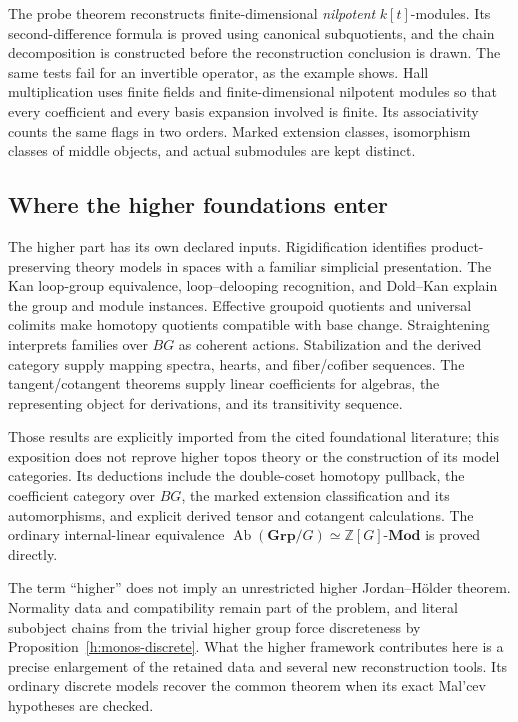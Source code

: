 The probe theorem reconstructs finite-dimensional \emph{nilpotent}
$k[t]$-modules. Its second-difference formula is proved using canonical
subquotients, and the chain decomposition is constructed before the
reconstruction conclusion is drawn. The same tests fail for an invertible
operator, as the example shows. Hall multiplication uses finite fields
and finite-dimensional nilpotent modules so that every coefficient and
every basis expansion involved is finite. Its associativity counts the
same flags in two orders. Marked extension classes, isomorphism classes
of middle objects, and actual submodules are kept distinct.

\subsection{Where the higher foundations enter}

The higher part has its own declared inputs. Rigidification identifies
product-preserving theory models in spaces with a familiar simplicial
presentation. The Kan loop-group equivalence, loop--delooping recognition,
and Dold--Kan explain the group and module
instances. Effective groupoid quotients and universal colimits make
homotopy quotients compatible with base change. Straightening interprets
families over $BG$ as coherent actions. Stabilization and the derived
category supply mapping spectra, hearts, and fiber/cofiber sequences.
The tangent/cotangent theorems supply linear coefficients for algebras,
the representing object for derivations, and its transitivity sequence.

Those results are explicitly imported from the cited foundational
literature; this exposition does not reprove higher topos theory or the
construction of its model categories. Its deductions include the
double-coset homotopy pullback, the coefficient category over $BG$, the
marked extension classification and its automorphisms, and explicit
derived tensor and cotangent calculations. The ordinary internal-linear
equivalence $\operatorname{Ab}(\mathbf{Grp}/G)\simeq
\mathbb Z[G]\text{-}\mathbf{Mod}$ is proved directly.

The term ``higher'' does not imply an unrestricted higher
Jordan--H\"older theorem. Normality data and compatibility remain part of
the problem, and literal subobject chains from the trivial higher group
force discreteness by Proposition~\ref{h:monos-discrete}. What the higher
framework contributes here is a precise enlargement of the retained data
and several new reconstruction tools. Its ordinary discrete models
recover the common theorem when its exact Mal'cev hypotheses are checked.

